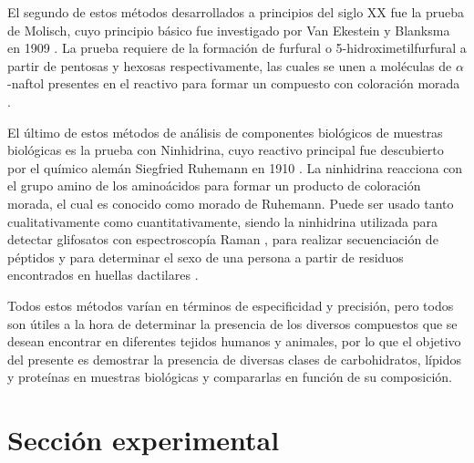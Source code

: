 \documentclass[fleqn,10pt]{SelfArx}
\begin{document}
	El segundo de estos métodos desarrollados a principios del siglo XX fue la prueba de Molisch, cuyo principio básico fue investigado por Van Ekestein y Blanksma en 1909 \cite{van1910omega}. La prueba requiere de la formación de furfural o 5-hidroximetilfurfural a partir de pentosas y hexosas respectivamente, las cuales se unen a moléculas de $\alpha$-naftol presentes en el reactivo para formar un compuesto con coloración morada \cite{devor1950carbohydrate}. 
	
	El último de estos métodos de análisis de componentes biológicos de muestras biológicas es la prueba con Ninhidrina, cuyo reactivo principal fue descubierto por el químico alemán Siegfried Ruhemann en 1910 \cite{ruhemann1910cxxxii, ruhemann1910ccxii}. La ninhidrina reacciona con el grupo amino de los aminoácidos para formar un producto de coloración morada, el cual es conocido como morado de Ruhemann. Puede ser usado tanto cualitativamente como cuantitativamente, siendo la ninhidrina utilizada para detectar glifosatos con espectroscopía Raman \cite{xu2018indirect}, para realizar secuenciación de péptidos \cite{friedman2004applications} y para determinar el sexo de una persona a partir de residuos encontrados en huellas dactilares \cite{brunelle2016new}. 
	
	Todos estos métodos varían en términos de especificidad y precisión, pero todos son útiles a la hora de determinar la presencia de los diversos compuestos que se desean encontrar en diferentes tejidos humanos y animales, por lo que el objetivo del presente es demostrar la presencia de diversas clases de carbohidratos, lípidos y proteínas en muestras biológicas y compararlas en función de su composición. 
	
\section{Secci\'on experimental}
\end{document}
